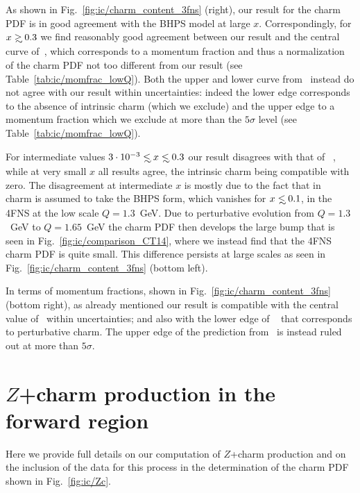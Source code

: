 As shown in Fig.~\ref{fig:ic/charm_content_3fns} (right), our result for
the charm PDF is in good agreement with the BHPS model at large
$x$. Correspondingly, for $x\gsim 0.3$
we find reasonably good agreement between our
result and the central curve of~\cite{Hou:2017khm}, which
corresponds to a momentum fraction and thus a normalization of the charm
PDF not too different from our result (see Table~\ref{tab:ic/momfrac_lowQ}).
%
Both the upper and lower curve from~\cite{Hou:2017khm} instead
do not agree with our result within uncertainties: indeed the
lower edge corresponds to the absence of intrinsic charm (which we
exclude) and the upper edge to a momentum fraction which we exclude
at more than the $5\sigma$ level (see Table~\ref{tab:ic/momfrac_lowQ}). 

For intermediate values $3\cdot10^{-3}\lsim x\lsim 0.3$  our result disagrees
with that of 
~\cite{Hou:2017khm}, while at very small $x$ all results agree,
the intrinsic charm being compatible with zero.
The disagreement at intermediate $x$ is mostly due
to the fact that in ~\cite{Hou:2017khm} charm is assumed to take
the BHPS form, which vanishes for $x\lsim 0.1$,
in the 4FNS at the low scale $Q=1.3$~GeV.
%
Due to perturbative evolution from  $Q=1.3$~GeV to $Q=1.65$~GeV the charm 
PDF then develops the large bump that is
seen in Fig.~\ref{fig:ic/comparison_CT14}, where we instead find that 
the 4FNS charm PDF is quite small.
%
This difference persists at large scales as seen  in
Fig.~\ref{fig:ic/charm_content_3fns} (bottom left).

In terms of momentum fractions, shown in Fig.~\ref{fig:ic/charm_content_3fns} (bottom right),
as already mentioned our result is
compatible with the central value of~\cite{Hou:2017khm} within
uncertainties; and also with the lower edge of ~\cite{Hou:2017khm}
that corresponds to perturbative charm.
%
The upper edge  of the prediction from~\cite{Hou:2017khm} is instead
ruled out at more than $5\sigma$. 


\section{$Z$+charm production in the forward region}
\label{sec:ic/zcharm}

Here we provide full details on our computation of  $Z$+charm
production and on the inclusion of the \lhcb data for this
process in the determination of the charm PDF shown in
Fig.~\ref{fig:ic/Zc}. 

